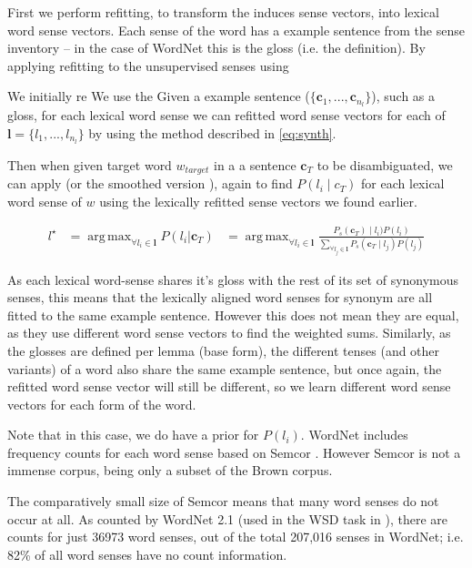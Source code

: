 \documentclass{sig-alternate}
\renewcommand{\c}{\mathbf{c}}
\renewcommand{\l}{\mathbf{l}}
\DeclareMathOperator*{\argmax}{arg\,max}
\begin{document}
First we perform refitting, to transform the induces sense vectors, into lexical word sense vectors. Each sense of the word has a example sentence from the sense inventory -- in the case of WordNet this is the gloss (i.e. the definition). By applying refitting to the unsupervised senses using


We initially re
We use the 
Given a example sentence ($\{\c_1,...,\c_{n_l}\}$), such as a gloss, for each lexical word sense we can refitted word sense vectors for each of $\l=\{l_1,..., l_{n_l}\}$ by using the method described in \cref{eq:synth}.

Then when given target word $w_{target}$ in a a sentence $\c_{T}$ to be disambiguated, we can apply  (or the smoothed version ), again to find $P(l_i \mid c_{T})$ for each lexical word sense of $w$ using the lexically refitted sense vectors we found earlier.

\[
\begin{aligned}\label{eq:lexicalwsd}
l^\star &= \argmax_{\forall l_i \in \l} P(l_i|\c_T)
&= \argmax_{\forall l_i \in \l} \frac{P_s(\c_T) \mid l_i)P(l_i)}{\sum_{\forall l_j \in \l} P_s(\c_T \mid l_j)P(l_j)}
\end{aligned}
\]

As each lexical word-sense shares it's gloss with the rest of its set of synonymous senses, this means that the lexically aligned word senses for synonym are all fitted to the same example sentence. However this does not mean they are equal, as they use different word sense vectors to find the weighted sums. Similarly, as the glosses are defined per lemma (base form), the different tenses (and other variants) of a word also share the same example sentence, but once again, the refitted word sense vector will still be different, so we learn different word sense vectors for each form of the word.



Note that in this case, we do have a prior for $P(l_i)$.
WordNet includes frequency counts for each word sense based on Semcor \textcite{tengi1998design}.
However Semcor is not a immense corpus, being only a subset of the Brown corpus.

The comparatively small size of Semcor means that many word senses do not occur at all. As counted by WordNet 2.1 (used in the WSD task in ), there are counts for just  36973 word senses, out of the total 207,016 senses in WordNet; i.e. 82\% of all word senses have no count information.
\end{document}
